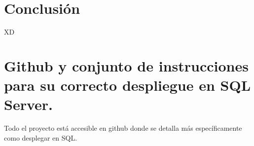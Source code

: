 \documentclass[12pt, a4paper, twoside]{article}
\begin{document}
	\section{Conclusión}
	
	XD


	\section{Github y conjunto de instrucciones para su correcto despliegue en SQL Server.}

	Todo el proyecto está accesible en github \cite{depab2024} donde se detalla más específicamente como desplegar en SQL.
	\printbibliography
	
	
	
	
\end{document}

